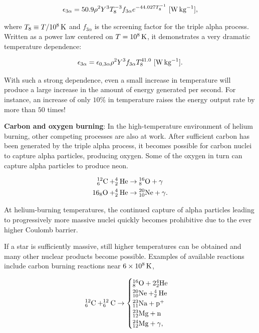 \documentclass[a4paper,10pt]{article}
\begin{document}
\begin{align*}
    \epsilon_{3\alpha} = 50.9\rho^2Y^3T_8^{-3}f_{3\alpha}e^{-44.027T_8^{-1}} ~ [{\rm W\,kg^{-1}}],
\end{align*}

{\noindent}where $T_8\equiv T/10^8\,{\rm K}$ and $f_{3\alpha}$ is the screening factor for the triple alpha process. Written as a power law centered on $T=10^8\,{\rm K}$, it demonstrates a very dramatic temperature dependence:

\begin{align*}
    \epsilon_{3\alpha} = \epsilon_{0,3\alpha}\rho^2Y^3f_{3\alpha}T_8^{41.0} ~ [{\rm W\,kg^{-1}}].
\end{align*}

{\noindent}With such a strong dependence, even a small increase in temperature will produce a large increase in the amount of energy generated per second. For instance, an increase of only $10\%$ in temperature raises the energy output rate by more than $50$ times!

{\noindent}\textbf{Carbon and oxygen burning}: In the high-temperature environment of helium burning, other competing processes are also at work. After sufficient carbon has been generated by the triple alpha process, it becomes possible for carbon nuclei to capture alpha particles, producing oxygen. Some of the oxygen in turn can capture alpha particles to produce neon.

\begin{align*}
    {\rm ^{12}_6C + ^4_2He} &\rightarrow {\rm ^{16}_8O + \gamma} \\
    {\rm {16}_8O + ^4_2He} &\rightarrow {\rm ^{20}_{10}Ne + \gamma}.
\end{align*}

{\noindent}At helium-burning temperatures, the continued capture of alpha particles leading to progressively more massive nuclei quickly becomes prohibitive due to the ever higher Coulomb barrier.

{\noindent}If a star is sufficiently massive, still higher temperatures can be obtained and many other nuclear products become possible. Examples of available reactions include carbon burning reactions near $6\times10^8\,{\rm K}$,

\begin{equation*}
^{12}_6{\rm C} + ^{12}_6{\rm C} \rightarrow 
\begin{cases}
    {\rm ^{16}_8O + 2^4_2He} \\
    {\rm ^{20}_{10}Ne + ^4_2He} \\
    {\rm ^{23}_{11}Na + p^+} \\
    {\rm ^{23}_{12}Mg + n} \\
    {\rm ^{24}_{12}Mg + \gamma},
\end{cases}
\end{equation*}
\end{document}
